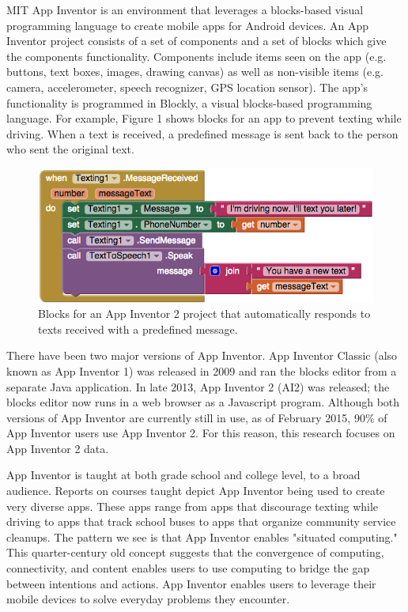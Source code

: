 \documentclass[conference]{IEEEtran}
\begin{document}
 

MIT App Inventor is an environment that leverages a blocks-based visual programming language to create mobile apps for Android devices. An App Inventor project consists of a set of components and a set of blocks which give the components functionality. Components include items seen on the app (e.g. buttons, text boxes, images, drawing canvas) as well as non-visible items (e.g. camera, accelerometer, speech recognizer, GPS location sensor).\cite{blockly} The app's functionality is programmed in Blockly, a visual blocks-based programming language. For example, Figure 1 shows blocks for an app to prevent texting while driving. When a text is received, a predefined message is sent back to the person who sent the original text.

\begin{figure}[h!]
	\centering
	\includegraphics[width=0.95\linewidth]{fig1.png}
	\caption{Blocks for an App Inventor 2 project that automatically responds to texts received with a predefined message.}
	\label{FIgure 1: Label}
\end{figure}

There have been two major versions of App Inventor. App Inventor Classic (also known as App Inventor 1) was released in 2009 and ran the blocks editor from a separate Java application. In late 2013, App Inventor 2 (AI2) was released; the blocks editor now runs in a web browser as a Javascript program.\cite{naming:turbak} Although both versions of App Inventor are currently still in use, as of February 2015, 90\% of App Inventor users use App Inventor 2. For this reason, this research focuses on App Inventor 2 data.

App Inventor is taught at both grade school and college level, to a broad audience. Reports on courses taught depict App Inventor being used to create very diverse apps. These apps range from apps that discourage texting while driving to apps that track school buses to apps that organize community service cleanups.\cite{thinking:turbak} The pattern we see is that App Inventor enables "situated computing." This quarter-century old concept suggests that the convergence of computing, connectivity, and content enables users to use computing to bridge the gap between intentions and actions. App Inventor enables users to leverage their mobile devices to solve everyday problems they encounter. \cite{situated:gershman}
\end{document}
